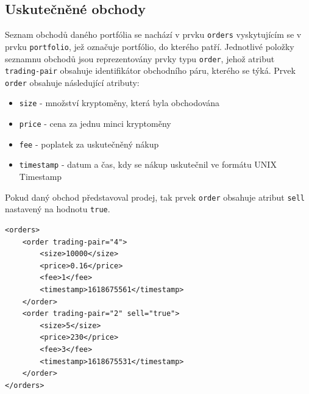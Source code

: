 \documentclass[12pt, a4paper]{article}
\begin{document}
\subsection{Uskutečněné obchody}
Seznam obchodů daného portfólia se nachází v prvku \texttt{orders} vyskytujícím se v prvku \texttt{portfolio}, jež označuje portfólio, do kterého patří. Jednotlivé položky seznamnu obchodů jsou reprezentovány prvky typu \texttt{order}, jehož atribut \texttt{trading-pair} obsahuje identifikátor obchodního páru, kterého se týká. Prvek \texttt{order} obsahuje následující atributy: 
\begin{itemize}
    \item \texttt{size} - množství kryptoměny, která byla obchodována
    \item \texttt{price} - cena za jednu minci kryptoměny
    \item \texttt{fee} - poplatek za uskutečněný nákup
    \item \texttt{timestamp} - datum a čas, kdy se nákup uskutečnil ve formátu UNIX Timestamp
\end{itemize}

Pokud daný obchod představoval prodej, tak prvek \texttt{order} obsahuje atribut \texttt{sell} nastavený na hodnotu \texttt{true}.

\begin{lstlisting}
<orders>
    <order trading-pair="4">
        <size>10000</size>
        <price>0.16</price>
        <fee>1</fee>
        <timestamp>1618675561</timestamp>
    </order>
    <order trading-pair="2" sell="true">
        <size>5</size>
        <price>230</price>
        <fee>3</fee>
        <timestamp>1618675531</timestamp>
    </order>
</orders>
\end{lstlisting}
\end{document}
